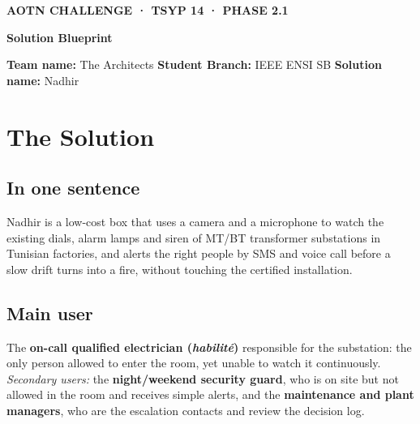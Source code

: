 \documentclass[10pt]{article}
\begin{document}
{\small\color{accent}\textbf{AOTN CHALLENGE · TSYP 14 · PHASE 2.1}}

\vspace{-2pt}
{\LARGE\bfseries\color{accent}Solution Blueprint}

\vspace{2pt}
\textbf{Team name:} The Architects \quad
\textbf{Student Branch:} IEEE ENSI SB \quad
\textbf{Solution name:} Nadhir

\vspace{-2pt}
\noindent{\color{accent}\rule{\linewidth}{0.8pt}}

\section{The Solution}

\subsection{In one sentence}
Nadhir is a low-cost box that uses a camera and a microphone to watch the existing dials, alarm lamps and siren of MT/BT transformer substations in Tunisian factories, and alerts the right people by SMS and voice call before a slow drift turns into a fire, without touching the certified installation.

\subsection{Main user}
The \textbf{on-call qualified electrician (\emph{habilité})} responsible for the substation: the only person allowed to enter the room, yet unable to watch it continuously.
\emph{Secondary users:} the \textbf{night/weekend security guard}, who is on site but not allowed in the room and receives simple alerts, and the \textbf{maintenance and plant managers}, who are the escalation contacts and review the decision log.
\end{document}
